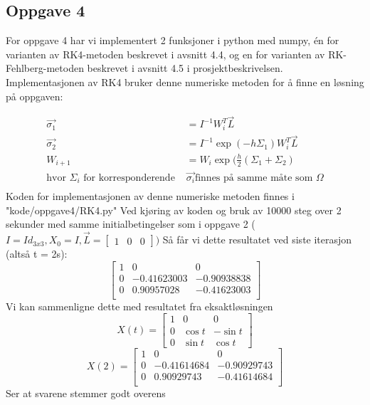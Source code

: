 \subsection{Oppgave 4}
\label{section:oppgave4}
For oppgave 4 har vi implementert 2 funksjoner i python med numpy, én for varianten av RK4-metoden beskrevet i avsnitt 4.4, og en for varianten av RK-Fehlberg-metoden beskrevet i avsnitt 4.5 i prosjektbeskrivelsen.\newline \newline
Implementasjonen av RK4 bruker denne numeriske metoden for å finne en løsning på oppgaven: \newline

$$
\begin{aligned}
\vec{\sigma_1} &= I^{-1}W_i^T \vec{L} \\
\vec{\sigma_2} &= I^{-1}\exp{(-h\Sigma_1)}W_i^T \vec{L} \\
W_{i+1} &= W_i \exp{(\frac{h}{2}(\Sigma_1 + \Sigma_2)} \\
\text{hvor } \Sigma_i \text{ for korresponderende }& \vec{\sigma_i} \text{finnes på samme måte som } \Omega \\
\end{aligned}
$$
Koden for implementasjonen av denne numeriske metoden finnes i "kode/oppgave4/RK4.py"\newline 
Ved kjøring av koden og bruk av 10000 steg over 2 sekunder med samme initialbetingelser som i oppgave 2 ($I=Id_{3x3}, X_0 = I, \vec{L} = \begin{bmatrix} 1 & 0 & 0\end{bmatrix})$ Så får vi dette resultatet ved siste iterasjon (altså t = 2s):\newline
$$
\begin{bmatrix}
1&0&0\\
0&-0.41623003&-0.90938838\\
0&0.90957028&-0.41623003\\
\end{bmatrix}
$$
Vi kan sammenligne dette med resultatet fra eksaktløsningen \newline
$$
    X(t)=\begin{bmatrix}1&0&0\\0&\cos t&-\sin t\\0&\sin t&\cos t\end{bmatrix}
$$
$$
    X(2) =     
    \begin{bmatrix}
    1 & 0 & 0\\
    0 & -0.41614684 & -0.90929743\\
    0 & 0.90929743 & -0.41614684\\
    \end{bmatrix}
$$ \newline Ser at svarene stemmer godt overens \newline \newline
